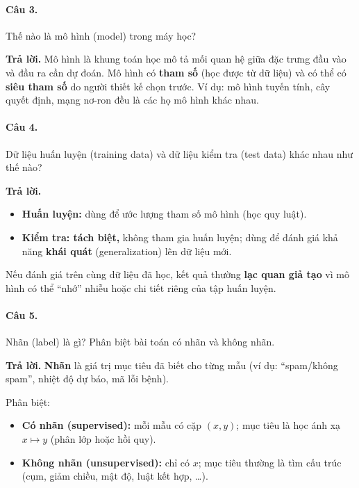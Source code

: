 \paragraph{Câu 3.} Thế nào là mô hình (model) trong máy học?

\medskip\noindent\textbf{Trả lời.} Mô hình là khung toán học mô tả mối quan hệ giữa đặc trưng đầu vào và đầu ra cần dự đoán. Mô hình có \textbf{tham số} (học được từ dữ liệu) và có thể có \textbf{siêu tham số} do người thiết kế chọn trước. Ví dụ: mô hình tuyến tính, cây quyết định, mạng nơ-ron đều là các họ mô hình khác nhau.

\paragraph{Câu 4.} Dữ liệu huấn luyện (training data) và dữ liệu kiểm tra (test data) khác nhau như thế nào?

\medskip\noindent\textbf{Trả lời.}
\begin{itemize}[nosep]
\item \textbf{Huấn luyện:} dùng để ước lượng tham số mô hình (học quy luật).
\item \textbf{Kiểm tra: tách biệt,} không tham gia huấn luyện; dùng để đánh giá khả năng \textbf{khái quát} (generalization) lên dữ liệu mới.
\end{itemize}
Nếu đánh giá trên cùng dữ liệu đã học, kết quả thường \textbf{lạc quan giả tạo} vì mô hình có thể ``nhớ'' nhiễu hoặc chi tiết riêng của tập huấn luyện.

\paragraph{Câu 5.} Nhãn (label) là gì? Phân biệt bài toán có nhãn và không nhãn.

\medskip\noindent\textbf{Trả lời.} \textbf{Nhãn} là giá trị mục tiêu đã biết cho từng mẫu (ví dụ: ``spam/không spam'', nhiệt độ dự báo, mã lỗi bệnh).

Phân biệt:
\begin{itemize}[nosep]
\item \textbf{Có nhãn (supervised):} mỗi mẫu có cặp $(x,y)$; mục tiêu là học ánh xạ $x \mapsto y$ (phân lớp hoặc hồi quy).
\item \textbf{Không nhãn (unsupervised):} chỉ có $x$; mục tiêu thường là tìm cấu trúc (cụm, giảm chiều, mật độ, luật kết hợp, \ldots).
\end{itemize}
